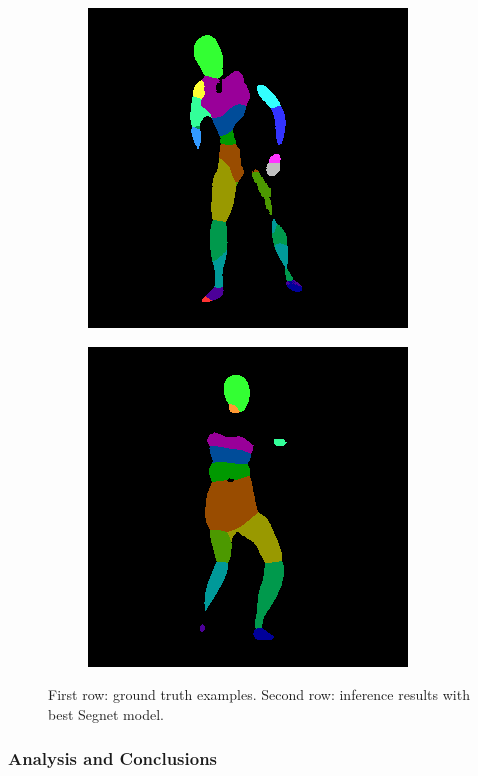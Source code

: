 \documentclass[12pt,a4paper]{article}
\begin{document}
\begin{figure}
\begin{subfigure}{.19\textwidth}
\end{subfigure}
\begin{subfigure}{.19\textwidth}
  \centering
  \includegraphics[scale=0.295]{104_52_c0002_segm_38_seg.png}
\end{subfigure}
\begin{subfigure}{.189\textwidth}
  \centering
  \includegraphics[scale=0.296]{ung_133_25_c0001_segm_29_seg.png}
\end{subfigure}

\caption{First row: ground truth examples. Second row: inference results with best Segnet model.}
\label{segnet:inference}
\end{figure}

\subsubsection{Analysis and Conclusions}
\end{document}
